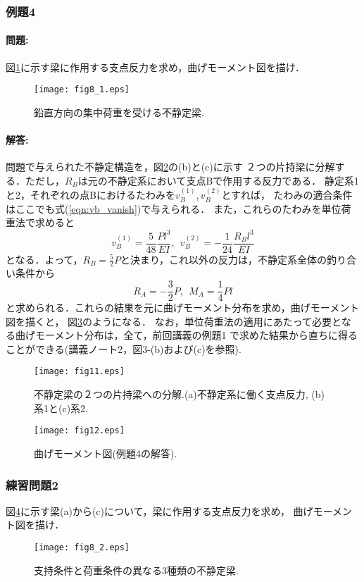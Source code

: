 ﻿\documentclass[10pt,a4j]{jarticle}
\begin{document}
\subsubsection{例題4}
\paragraph{問題:}
図\ref{fig:fig8_1}に示す梁に作用する支点反力を求め，曲げモーメント図を描け．
\begin{figure}
	\begin{center}
	\texttt{[image: fig8\_1.eps]} 
	\end{center}
	\caption{鉛直方向の集中荷重を受ける不静定梁.} 
	\label{fig:fig8_1}
\end{figure}
\paragraph{解答:}
問題で与えられた不静定構造を，図\ref{fig:fig11}の(b)と(c)に示す
２つの片持梁に分解する．ただし，$R_B$は元の不静定系において支点Bで作用する反力である．
静定系1と2，それぞれの点Bにおけるたわみを$v_B^{(1)},v_B^{(2)}$とすれば，
たわみの適合条件はここでも式(\ref{eqn:vb_vanish})で与えられる．
また，これらのたわみを単位荷重法で求めると
\begin{equation}
	v_B^{(1)}=
	\frac{5}{48} \frac{Pl^3}{EI}, \ \ 
	 v_B^{(2)}=
	-\frac{1}{24} \frac{R_Bl^3}{EI}
	\label{eqn:}
\end{equation}
となる．よって，$R_B=\frac{5}{2}P$と決まり，これ以外の反力は，不静定系全体の釣り合い条件から
\begin{equation}
	R_A=-\frac{3}{2}P, \ \ M_A=\frac{1}{4}Pl
	\label{eqn:}
\end{equation}
と求められる．これらの結果を元に曲げモーメント分布を求め，曲げモーメント図を描くと，
図\ref{fig:fig12}のようになる．
なお，単位荷重法の適用にあたって必要となる曲げモーメント分布は，全て，前回講義の例題1
で求めた結果から直ちに得ることができる(講義ノート2，図3-(b)および(c)を参照).
\begin{figure}[h]
	\begin{center}
	\texttt{[image: fig11.eps]} 
	\end{center}
	\caption{不静定梁の２つの片持梁への分解.(a)不静定系に働く支点反力, (b)系1と(c)系2.} 
	\label{fig:fig11}
\end{figure}
\begin{figure}[h]
	\begin{center}
	\texttt{[image: fig12.eps]} 
	\end{center}
	\caption{曲げモーメント図(例題4の解答).} 
	\label{fig:fig12}
\end{figure}
\subsubsection{練習問題2}
図\ref{fig:fig8_2}に示す梁(a)から(c)について，梁に作用する支点反力を求め，
曲げモーメント図を描け．
\begin{figure}
	\begin{center}
	\texttt{[image: fig8\_2.eps]} 
	\end{center}
	\caption{支持条件と荷重条件の異なる3種類の不静定梁. } 
	\label{fig:fig8_2}
\end{figure}
\end{document}
